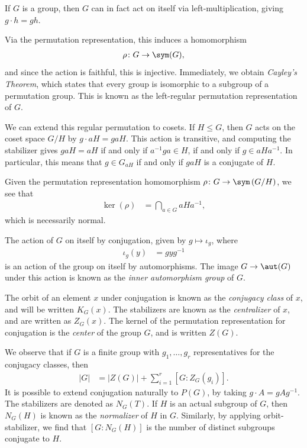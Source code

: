 \documentclass[10pt]{mypackage}
\begin{document}
\begin{example}
  If $G$ is a group, then $G$ can in fact act on itself via left-multiplication, giving $g\cdot h = gh$.%

  Via the permutation representation, this induces a homomorphism
  \begin{align*}
    \rho\colon G\rightarrow \sym(G),
  \end{align*}
  and since the action is faithful, this is injective. Immediately, we obtain \textit{Cayley's Theorem}, which states that every group is isomorphic to a subgroup of a permutation group. This is known as the left-regular permutation representation of $G$.%

  We can extend this regular permutation to cosets. If $H\leq G$, then $G$ acts on the coset space $G/H$ by $g\cdot aH = gaH$. This action is transitive, and computing the stabilizer gives $gaH = aH$ if and only if $a^{-1}ga\in H$, if and only if $g\in aHa^{-1}$. In particular, this means that $g\in G_{aH}$ if and only if $gaH$ is a conjugate of $H$.%

  Given the permutation representation homomorphism $\rho\colon G\rightarrow \sym\left( G/H \right)$, we see that
  \begin{align*}
    \ker\left( \rho \right) &= \bigcap_{a\in G}aHa^{-1},
  \end{align*}
  which is necessarily normal.
\end{example}
\begin{example}
  The action of $G$ on itself by conjugation, given by $g\mapsto \iota_g$, where
  \begin{align*}
    \iota_g\left( y \right) &= gyg^{-1}
  \end{align*}
  is an action of the group on itself by automorphisms. The image $G\rightarrow \aut(G)$ under this action is known as the \textit{inner automorphism group} of $G$.%

  The orbit of an element $x$ under conjugation is known as the \textit{conjugacy class} of $x$, and will be written $K_G(x)$. The stabilizers are known as the \textit{centralizer} of $x$, and are written as $Z_G(x)$. The kernel of the permutation representation for conjugation is the \textit{center} of the group $G$, and is written $Z(G)$.%

  We observe that if $G$ is a finite group with $g_1,\dots,g_r$ representatives for the conjugacy classes, then
  \begin{align*}
    \left\vert G \right\vert &= \left\vert Z(G) \right\vert + \sum_{i=1}^{r} \left[ G:Z_G\left(g_i\right) \right].
  \end{align*}
  It is possible to extend conjugation naturally to $P(G)$, by taking $g\cdot A = gAg^{-1}$. The stabilizers are denoted as $N_G(T)$. If $H$ is an actual subgroup of $G$, then $N_G(H)$ is known as the \textit{normalizer} of $H$ in $G$. Similarly, by applying orbit-stabilizer, we find that $\left[ G:N_G(H) \right]$ is the number of distinct subgroups conjugate to $H$.
\end{example}
\end{document}
